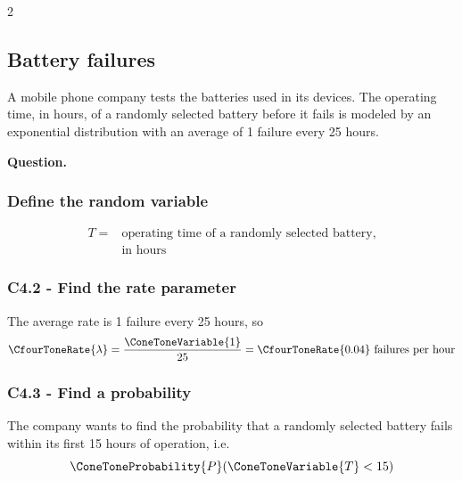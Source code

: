 \begin{multicols}{2}
	
	\subsection{Battery failures}\label{sec:c4-probability-battery}
	
	A mobile phone company tests the batteries used in its devices. The
	operating time, in hours, of a randomly selected battery before it fails
	is modeled by an exponential distribution with an average of 1 failure
	every 25 hours.
	
	\textbf{Question.}
	\begin{enumerate}
	\end{enumerate}
	
	\subsubsection*{Define the random variable}\label{subsec:c4-probability-battery-a}
	
	\[
	\boxed{
		\begin{aligned}
			T={}&\text{operating time of a randomly selected battery,}\\
			&\text{in hours}
	\end{aligned}}
	\]
	
	\subsubsection*{C4.2 - Find the rate parameter}\label{subsec:c4-probability-battery-rate}
	
	The average rate is 1 failure every 25 hours, so
	\[
	\CfourToneRate{\lambda}=\frac{\ConeToneVariable{1}}{25}=\CfourToneRate{0.04}\text{ failures per hour}
	\]
	
	\subsubsection*{C4.3 - Find a probability}\label{subsec:c4-probability-battery-b}
	
	The company wants to find the probability that a randomly selected
	battery fails within its first 15 hours of operation, i.e.
	\[
	\ConeToneProbability{P}(\ConeToneVariable{T}<15)
	\]
	

\end{multicols}
